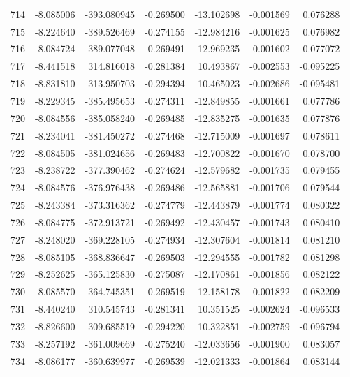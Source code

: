 \begin{tabular}{rrrrrrr}
 714 &  -8.085006 & -393.080945 & -0.269500 & -13.102698 &  -0.001569 &  0.076288 \\
 715 &  -8.224640 & -389.526469 & -0.274155 & -12.984216 &  -0.001625 &  0.076982 \\
 716 &  -8.084724 & -389.077048 & -0.269491 & -12.969235 &  -0.001602 &  0.077072 \\
 717 &  -8.441518 &  314.816018 & -0.281384 &  10.493867 &  -0.002553 & -0.095225 \\
 718 &  -8.831810 &  313.950703 & -0.294394 &  10.465023 &  -0.002686 & -0.095481 \\
 719 &  -8.229345 & -385.495653 & -0.274311 & -12.849855 &  -0.001661 &  0.077786 \\
 720 &  -8.084556 & -385.058240 & -0.269485 & -12.835275 &  -0.001635 &  0.077876 \\
 721 &  -8.234041 & -381.450272 & -0.274468 & -12.715009 &  -0.001697 &  0.078611 \\
 722 &  -8.084505 & -381.024656 & -0.269483 & -12.700822 &  -0.001670 &  0.078700 \\
 723 &  -8.238722 & -377.390462 & -0.274624 & -12.579682 &  -0.001735 &  0.079455 \\
 724 &  -8.084576 & -376.976438 & -0.269486 & -12.565881 &  -0.001706 &  0.079544 \\
 725 &  -8.243384 & -373.316362 & -0.274779 & -12.443879 &  -0.001774 &  0.080322 \\
 726 &  -8.084775 & -372.913721 & -0.269492 & -12.430457 &  -0.001743 &  0.080410 \\
 727 &  -8.248020 & -369.228105 & -0.274934 & -12.307604 &  -0.001814 &  0.081210 \\
 728 &  -8.085105 & -368.836647 & -0.269503 & -12.294555 &  -0.001782 &  0.081298 \\
 729 &  -8.252625 & -365.125830 & -0.275087 & -12.170861 &  -0.001856 &  0.082122 \\
 730 &  -8.085570 & -364.745351 & -0.269519 & -12.158178 &  -0.001822 &  0.082209 \\
 731 &  -8.440240 &  310.545743 & -0.281341 &  10.351525 &  -0.002624 & -0.096533 \\
 732 &  -8.826600 &  309.685519 & -0.294220 &  10.322851 &  -0.002759 & -0.096794 \\
 733 &  -8.257192 & -361.009669 & -0.275240 & -12.033656 &  -0.001900 &  0.083057 \\
 734 &  -8.086177 & -360.639977 & -0.269539 & -12.021333 &  -0.001864 &  0.083144 \\

\end{tabular}
